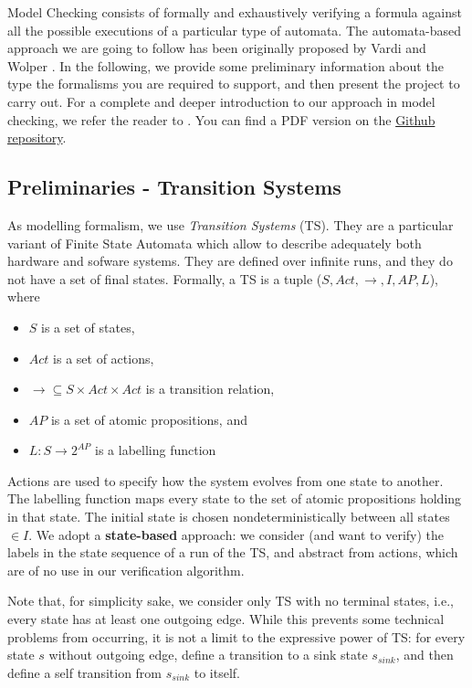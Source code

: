 \documentclass{article}
\begin{document}
Model Checking consists of formally and exhaustively verifying a formula 
against all the possible executions of a particular type of automata. 
The automata-based approach we are going to follow has been originally proposed by 
Vardi and Wolper \cite{VarWo}.
In the following, we provide some preliminary information 
about the type the formalisms you are required to support, 
and then present the project to carry out. 
For a complete and deeper introduction to our approach in model checking, 
we refer the reader to \cite{BaKa}. You can find a PDF version on the 
\href{https://github.com/francescopont/MiniCheck.git}{Github repository}.


\subsection{Preliminaries - Transition Systems}
As modelling formalism, we use \emph{Transition Systems} (TS). They are a particular variant 
of Finite State Automata which allow to describe adequately both hardware and sofware systems. 
They are defined over infinite runs, and they do not have a set of final states. 
Formally, a TS is a tuple ($S, Act, \rightarrow, I, AP, L$), where 
\begin{itemize}
    \item $S$ is a set of states,
    \item $Act$ is a set of actions,
    \item $\longrightarrow \subseteq S \times Act \times Act$ is a transition relation,
    \item $AP$ is a set of atomic propositions, and 
    \item $L : S \rightarrow 2^{AP}$ is a labelling function
\end{itemize}
Actions are used to specify how the system evolves from one state to another. The labelling function 
maps every state to the set of atomic propositions holding in that state. The initial state is chosen 
nondeterministically between all states $\in I$.
We adopt a \textbf{state-based} approach: we consider (and want to verify) the labels in the state sequence 
of a run of the TS, and abstract from actions, which are of no use in our verification algorithm. 

Note that, for simplicity sake, we consider only TS with no terminal states, i.e., every state has at least 
one outgoing edge. While this prevents some technical problems from occurring, it is not a limit to the 
expressive power of TS: for every state $s$ without outgoing edge, define a transition to a sink state 
$s_ {sink}$, and then define a self transition from $s_ {sink}$ to itself.
\end{document}
